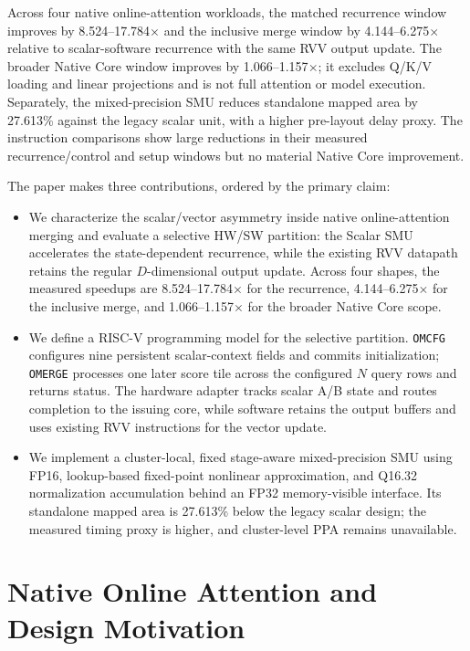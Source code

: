 \documentclass[journal]{IEEEtran}
\begin{document}
Across four native online-attention workloads, the matched recurrence window
improves by 8.524--17.784$\times$ and the inclusive merge window by
4.144--6.275$\times$ relative to scalar-software recurrence with the same RVV
output update. The broader Native Core window improves by 1.066--1.157$\times$;
it excludes Q/K/V loading and linear projections and is not full attention or
model execution. Separately, the mixed-precision SMU reduces standalone mapped area
by 27.613\% against the legacy scalar unit, with a higher pre-layout delay
proxy. The instruction comparisons show large reductions in their measured
recurrence/control and setup windows but no material Native Core improvement.

The paper makes three contributions, ordered by the primary claim:
\begin{itemize}
    \item We characterize the scalar/vector asymmetry inside native
    online-attention merging and evaluate a selective HW/SW partition: the
    Scalar SMU accelerates the state-dependent recurrence, while the existing
    RVV datapath retains the regular $D$-dimensional output update. Across four
    shapes, the measured speedups are 8.524--17.784$\times$ for the recurrence,
    4.144--6.275$\times$ for the inclusive merge, and 1.066--1.157$\times$ for
    the broader Native Core scope.

    \item We define a RISC-V programming model for the selective partition.
    \texttt{OMCFG} configures nine persistent scalar-context fields and commits
    initialization; \texttt{OMERGE} processes one later score tile across the
    configured $N$ query rows and returns status. The hardware adapter tracks scalar A/B state and routes completion
    to the issuing core, while software retains the output buffers and uses
    existing RVV instructions for the vector update.

    \item We implement a cluster-local, fixed stage-aware mixed-precision SMU
    using FP16, lookup-based fixed-point nonlinear approximation, and Q16.32
    normalization accumulation behind an FP32 memory-visible interface. Its
    standalone mapped area is 27.613\% below the legacy scalar design; the
    measured timing proxy is higher, and cluster-level PPA remains unavailable.
\end{itemize}

\section{Native Online Attention and Design Motivation}
\end{document}
